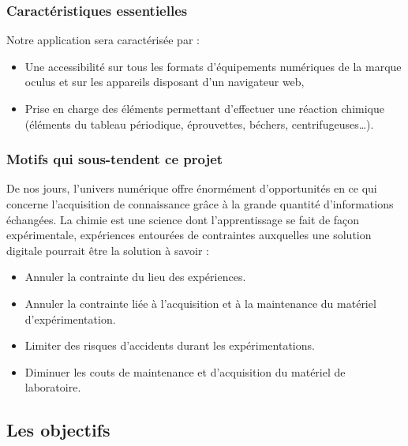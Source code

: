 \subsubsection{Caractéristiques essentielles}

Notre application sera caractérisée par :

\begin{itemize}
	\item Une accessibilité sur tous les formats d’équipements numériques de la marque oculus et sur les appareils disposant d’un navigateur web,
	\item Prise en charge des éléments permettant d’effectuer une réaction chimique (éléments du tableau périodique, éprouvettes, béchers, centrifugeuses…).
\end{itemize}

\subsubsection{Motifs qui sous-tendent ce projet}

De nos jours, l’univers numérique offre énormément d'opportunités en ce qui concerne l'acquisition de connaissance grâce à la grande quantité d’informations échangées. 
La chimie est une science dont l'apprentissage se fait de façon expérimentale, expériences entourées de contraintes auxquelles une solution digitale pourrait être la solution à savoir :

\begin{itemize}
	\item Annuler la contrainte du lieu des expériences.
	\item Annuler la contrainte liée à l’acquisition et à la maintenance du matériel d'expérimentation.
	\item Limiter des risques d’accidents durant les expérimentations.
	\item Diminuer les couts de maintenance et d’acquisition du matériel de laboratoire.
\end{itemize}

\subsection{Les objectifs}

